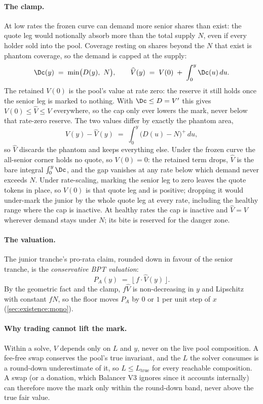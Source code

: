 \paragraph{The clamp.}
At low rates the frozen curve can demand more senior shares than
exist: the quote leg would notionally absorb more than the total
supply $N$, even if every holder sold into the pool. Coverage resting
on shares beyond the $N$ that exist is phantom coverage, so the demand
is capped at the supply:
\[
  \Dc(y) \;=\; \min\bigl(D(y),\ N\bigr),
  \qquad
  \widehat{V}(y) \;=\; V(0) \;+\; \int_0^y \Dc(u)\,du.
\]
The retained $V(0)$ is the pool's value at rate zero: the reserve it
still holds once the senior leg is marked to nothing. With
$\Dc \leq D = V'$ this gives $V(0) \leq \widehat{V} \leq V$ everywhere,
so the cap only ever lowers the mark, never below that rate-zero
reserve. The two values differ by exactly the phantom area,
\[
  V(y) - \widehat{V}(y)
    \;=\; \int_0^y \bigl(D(u) - N\bigr)^{+}\,du,
\]
so $\widehat{V}$ discards the phantom and keeps everything else. Under
the frozen curve the all-senior corner holds no quote, so $V(0) = 0$:
the retained term drops, $\widehat{V}$ is the bare integral
$\int_0^y \Dc$, and the gap vanishes at any rate below which demand
never exceeds $N$. Under rate-scaling, marking the senior leg to zero
leaves the quote tokens in place, so $V(0)$ is that quote leg and is
positive; dropping it would under-mark the junior by the whole quote leg
at every rate, including the healthy range where the cap is inactive. At
healthy rates the cap is inactive and $\widehat{V} = V$ wherever demand
stays under $N$; its bite is reserved for the danger zone.

\paragraph{The valuation.}
The junior tranche's pro-rata claim, rounded down in favour of the
senior tranche, is the \emph{conservative BPT valuation}:
\begin{equation}
  P_A(y) \;=\; \bigl\lfloor\, f \cdot \widehat{V}(y) \,\bigr\rfloor.
  \label{eq:PA}
\end{equation}
By the geometric fact and the clamp, $f\widehat{V}$ is non-decreasing
in $y$ and Lipschitz with constant $f N$, so the floor moves $P_A$ by
$0$ or $1$ per unit step of $x$ (\cref{sec:existence:mono}).

\paragraph{Why trading cannot lift the mark.}
Within a solve, $V$ depends only on $L$ and $y$, never on the live
pool composition. A fee-free swap conserves the pool's true invariant,
and the $L$ the solver consumes is a round-down underestimate of it,
so $L \leq L_{\mathrm{true}}$ for every reachable composition. A swap
(or a donation, which Balancer V3 ignores since it accounts
internally) can therefore move the mark only within the round-down
band, never above the true fair value.

